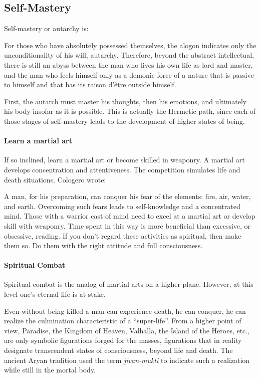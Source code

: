 \subsection*{Self-Mastery}
Self-mastery or autarchy is:

\begin{quotex}
For those who have absolutely possessed themselves, the alogon indicates only the unconditionality of his will, autarchy. Therefore, beyond the abstract intellectual, there is still an abyss between the man who lives his own life as lord and master, and the man who feels himself only as a demonic force of a nature that is passive to himself and that has its raison d'être outside himself. 

\end{quotex}
First, the autarch must master his thoughts, then his emotions, and ultimately his body insofar as it is possible. This is actually the Hermetic path, since each of those stages of self-mastery leads to the development of higher states of being.

\paragraph{Learn a martial art}
If so inclined, learn a martial art or become skilled in weaponry. A martial art develops concentration and attentiveness. The competition simulates life and death situations. Cologero wrote:

\begin{quotex}
A man, for his preparation, can conquer his fear of the elements: fire, air, water, and earth. Overcoming such fears leads to self-knowledge and a concentrated mind. Those with a warrior cast of mind need to excel at a martial art or develop skill with weaponry. Time spent in this way is more beneficial than excessive, or obsessive, reading. If you don't regard these activities as spiritual, then make them so. Do them with the right attitude and full consciousness. 

\end{quotex}
\paragraph{Spiritual Combat}
Spiritual combat is the analog of martial arts on a higher plane. However, at this level one's eternal life is at stake.

\begin{quotex}
Even without being killed a man can experience death, he can conquer, he can realize the culmination characteristic of a “super-life”. From a higher point of view, Paradise, the Kingdom of Heaven, Valhalla, the Island of the Heroes, etc., are only symbolic figurations forged for the masses, figurations that in reality designate transcendent states of consciousness, beyond life and death. The ancient Aryan tradition used the term \emph{jivan-mukti} to indicate such a realization while still in the mortal body. 

\end{quotex}
